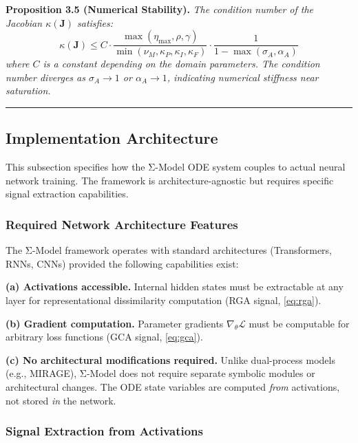 \documentclass[11pt,a4paper]{article}
\begin{document}
\textbf{Proposition 3.5 (Numerical Stability).}
\textit{The condition number of the Jacobian $\kappa(\mathbf{J})$ satisfies:
\begin{equation}\label{eq:condition-number}
\kappa(\mathbf{J}) \leq C \cdot \frac{\max(\eta_{\max}, \rho, \gamma)}{\min(\nu_M, \kappa_P, \kappa_I, \kappa_F)} \cdot \frac{1}{1 - \max(\sigma_A, \alpha_A)}
\end{equation}
where $C$ is a constant depending on the domain parameters. The condition
number diverges as $\sigma_A \to 1$ or $\alpha_A \to 1$, indicating
numerical stiffness near saturation.}

\noindent\rule{\linewidth}{0.4pt}

\subsection{Implementation Architecture}\label{sec:implementation}

This subsection specifies how the Σ-Model ODE system couples to actual
neural network training. The framework is architecture-agnostic but
requires specific signal extraction capabilities.

\subsubsection{Required Network Architecture Features}

The Σ-Model framework operates with standard architectures (Transformers,
RNNs, CNNs) provided the following capabilities exist:

\textbf{(a) Activations accessible.} Internal hidden states must be
extractable at any layer for representational dissimilarity computation
(RGA signal, \eqref{eq:rga}).

\textbf{(b) Gradient computation.} Parameter gradients $\nabla_\theta
\mathcal{L}$ must be computable for arbitrary loss functions (GCA signal,
\eqref{eq:gca}).

\textbf{(c) No architectural modifications required.} Unlike dual-process
models (e.g., MIRAGE), Σ-Model does not require separate symbolic modules
or architectural changes. The ODE state variables are computed \textit{from}
activations, not stored \textit{in} the network.

\subsubsection{Signal Extraction from Activations}
\end{document}
